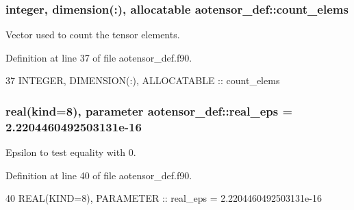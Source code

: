 \subsubsection[{\texorpdfstring{count\+\_\+elems}{count_elems}}]{\setlength{\rightskip}{0pt plus 5cm}integer, dimension(\+:), allocatable aotensor\+\_\+def\+::count\+\_\+elems\hspace{0.3cm}{\ttfamily [private]}}\hypertarget{namespaceaotensor__def_aa9e30c84efc5a81409ba9c0286c87eac}{}\label{namespaceaotensor__def_aa9e30c84efc5a81409ba9c0286c87eac}


Vector used to count the tensor elements. 



Definition at line 37 of file aotensor\+\_\+def.\+f90.


\begin{DoxyCode}
37   \textcolor{keywordtype}{INTEGER}, \textcolor{keywordtype}{DIMENSION(:)}, \textcolor{keywordtype}{ALLOCATABLE} :: count\_elems
\end{DoxyCode}
\subsubsection[{\texorpdfstring{real\+\_\+eps}{real_eps}}]{\setlength{\rightskip}{0pt plus 5cm}real(kind=8), parameter aotensor\+\_\+def\+::real\+\_\+eps = 2.\+2204460492503131e-\/16\hspace{0.3cm}{\ttfamily [private]}}\hypertarget{namespaceaotensor__def_ab1cf9313fb1def1a17de539cfa922e35}{}\label{namespaceaotensor__def_ab1cf9313fb1def1a17de539cfa922e35}


Epsilon to test equality with 0. 



Definition at line 40 of file aotensor\+\_\+def.\+f90.


\begin{DoxyCode}
40   \textcolor{keywordtype}{REAL(KIND=8)}, \textcolor{keywordtype}{PARAMETER} :: real\_eps = 2.2204460492503131e-16
\end{DoxyCode}
